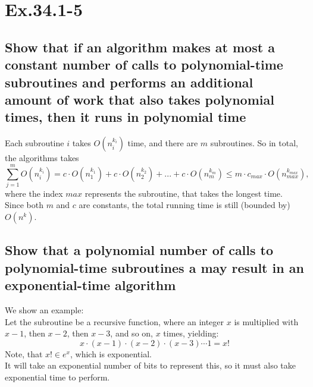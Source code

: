 \section*{Ex.34.1-5}
\subsection*{Show that if an algorithm makes at most a constant number of calls to polynomial-time subroutines and performs an additional amount of work that also takes polynomial times, then it runs in polynomial time}

Each subroutine $i$ takes $O(n^{k_i}_i)$ time, and there are $m$ subroutines. So in total, the algorithms takes
$$
\sum^m_{j=1} O(n^{k_i}_i) = c\cdot O(n^{k_1}_1) + c\cdot O(n^{k_2}_2) + ... + c\cdot O(n^{k_m}_m) \leq m\cdot c_{max}\cdot O(n^{k_{max}}_{max}),
$$
where the index $max$ represents the subroutine, that takes the longest time.
\\
Since both $m$ and $c$ are constants, the total running time is still (bounded by) $O(n^k)$.

\subsection*{Show that a polynomial number of calls to polynomial-time subroutines a may result in an exponential-time algorithm}

We show an example:
\\
Let the subroutine be a recursive function, where an integer $x$ is multiplied with $x-1$, then $x-2$, then $x-3$, and so on, $x$ times, yielding:
$$
x\cdot (x-1)\cdot (x-2)\cdot (x-3)\cdots 1 = x!
$$
Note, that $x!\in e^x$, which is exponential.
\\
It will take an exponential number of bits to represent this, so it must also take exponential time to perform.